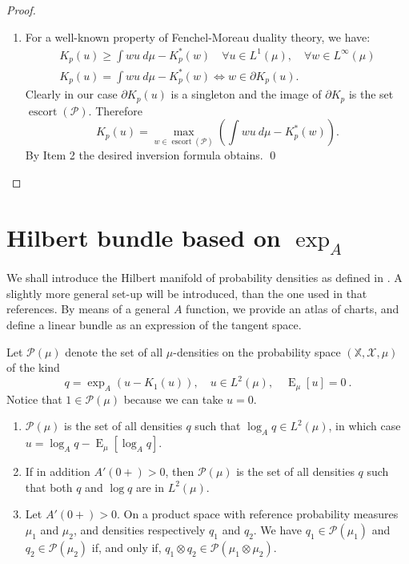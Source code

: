\documentclass[graybox]{svmult}
\DeclareMathOperator{\Expectation}{E}
\newcommand{\escortof}[1]{\operatorname{escort}\left(#1\right)}
\newcommand{\expectat}[2]{{\Expectation}_{#1}\left[#2\right]}
\begin{document}
\begin{proof}
\begin{enumerate}
\item For a well-known property of Fenchel-Moreau duality theory, we have:
\begin{align*}
K_{p}\left( u\right) \geq \int wu\ d\mu - K_p^*(w) \quad \forall u \in L^1 (\mu ), \quad \forall w \in L^{\infty }(\mu ) \\
K_{p}\left( u\right) = \int wu\ d\mu - K_p^*(w) \iff w \in \partial K_{p}\left( u\right).   
\end{align*}
Clearly in our case $\partial K_{p}\left( u\right)$ is a singleton and the image of $\partial K_{p}$ is the set 
$\escortof{\mathcal P}$. Therefore
\begin{equation*}
K_{p}\left( u\right) = \max_{w \in  \escortof {\mathcal P} }\left(\int wu\ d\mu - K_p^*(w) \right).
\end{equation*}
By Item 2 the desired inversion formula obtains.
\qed
\end{enumerate}
\end{proof}

\section{Hilbert bundle based on $\exp_A$}
\label{sec:riem-manif-based}

We shall introduce the Hilbert manifold of probability densities as defined in \cite{newton:2012,newton:2016}. A slightly more general set-up will be introduced, than the one used in that references. By means of a general $A$ function, we provide an atlas of charts, and define a linear bundle as an expression of the tangent space.

Let $\mathcal{P}(\mu )$ denote the set of all $\mu $-densities on the
probability space $(\mathbb{X},\mathcal{X},\mu )$ of the kind 
\begin{equation}\label{eq:Pmu}
q=\exp _{A}(u-K_{1}(u)),\quad u\in L^{2}(\mu ),\quad {\Expectation}_{\mu }\left[ u
\right] =0 \ .
\end{equation}
Notice that $1\in \mathcal{P}(\mu )$ because we can 
take $u=0$.

\begin{proposition}
  \begin{enumerate}
  \item $\mathcal{P}(\mu )$ is the set of all densities $q$ such that $\log _{A}q\in L^{2}(\mu )$, in which case $u = \log_A q - \expectat \mu {\log_A q}$.
  \item If in addition $A'(0+)>0$, then $\mathcal{P}(\mu )$ is the set of all densities $q$ such that both $q$ and $\log q$ are in $L^{2}(\mu )$. 
  \item Let $A'(0+) > 0$. On a product space with reference probability measures $\mu_1$ and $\mu_2$, and densities respectively $q_1$ and $q_2$. We have $q_1 \in \mathcal P(\mu_1)$ and $q_2 \in \mathcal P(\mu_2)$ if, and only if, $q_1 \otimes q_2 \in \mathcal P(\mu_1 \otimes \mu_2)$. 
  \end{enumerate}
\end{proposition}
\end{document}
